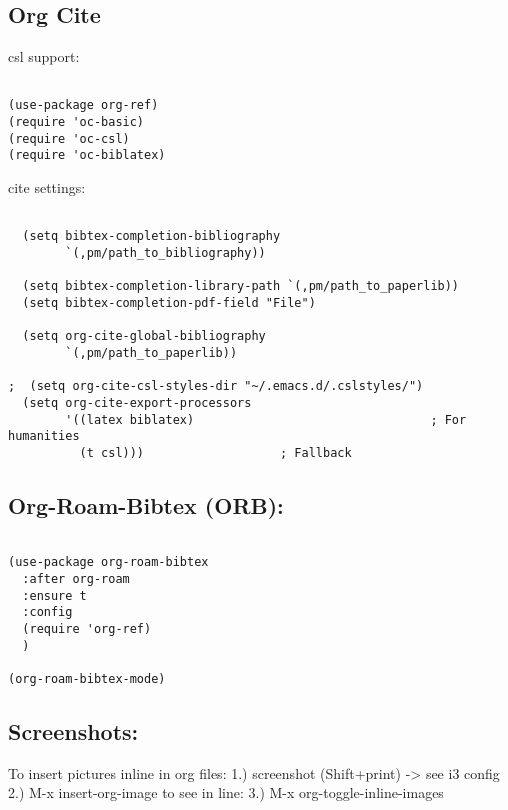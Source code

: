 \documentclass[11pt]{article}
\begin{document}
\subsection{Org Cite}
\label{sec:org6be55df}

csl support:
\begin{verbatim}

(use-package org-ref)
(require 'oc-basic)
(require 'oc-csl)
(require 'oc-biblatex)

\end{verbatim}

cite settings:

\begin{verbatim}

  (setq bibtex-completion-bibliography
		`(,pm/path_to_bibliography))

  (setq bibtex-completion-library-path `(,pm/path_to_paperlib))
  (setq bibtex-completion-pdf-field "File")

  (setq org-cite-global-bibliography
		`(,pm/path_to_paperlib))

;  (setq org-cite-csl-styles-dir "~/.emacs.d/.cslstyles/")
  (setq org-cite-export-processors
		'((latex biblatex)                                 ; For humanities
		  (t csl)))                   ; Fallback

\end{verbatim}

\subsection{Org-Roam-Bibtex (ORB):}
\label{sec:org4428f4d}

\begin{verbatim}

(use-package org-roam-bibtex
  :after org-roam
  :ensure t
  :config
  (require 'org-ref)
  )

(org-roam-bibtex-mode)
\end{verbatim}

\subsection{Screenshots:}
\label{sec:org06da865}
To insert pictures inline in org files:
1.) screenshot (Shift+print) -> see i3 config
2.) M-x insert-org-image
to see in line:
3.) M-x org-toggle-inline-images
\end{document}

